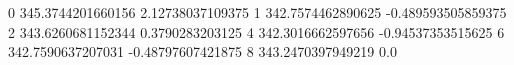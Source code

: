 0 345.3744201660156 2.12738037109375
1 342.7574462890625 -0.489593505859375
2 343.6260681152344 0.3790283203125
4 342.3016662597656 -0.94537353515625
6 342.7590637207031 -0.48797607421875
8 343.2470397949219 0.0
